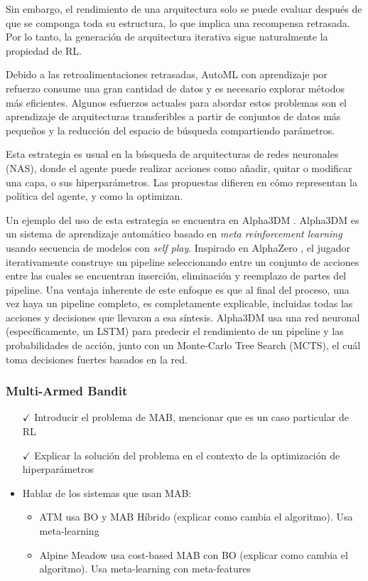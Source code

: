 Sin embargo, el rendimiento de una arquitectura solo se puede evaluar después de que se componga toda su estructura, lo que implica una recompensa retrasada. Por lo tanto, la generación de arquitectura iterativa sigue naturalmente la propiedad de RL. 

Debido a las retroalimentaciones retrasadas, AutoML con aprendizaje por refuerzo consume una gran cantidad de datos y es necesario explorar métodos más eficientes. Algunos esfuerzos actuales para abordar estos problemas son el aprendizaje de arquitecturas transferibles a partir de conjuntos de datos más pequeños y la reducción del espacio de búsqueda compartiendo parámetros.

Esta estrategia es usual en la búsqueda de arquitecturas de redes neuronales (NAS), donde el agente puede realizar acciones como añadir, quitar o modificar una capa, o sus hiperparámetros. Las propuestas difieren en cómo representan la política del agente, y como la optimizan.

Un ejemplo del uso de esta estrategia se encuentra en Alpha3DM \cite{drori2018alphad3m}. Alpha3DM es un sistema de aprendizaje automático basado en \textit{meta reinforcement learning} usando secuencia de modelos con \textit{self play}. Inspirado en AlphaZero \cite{alphazero}, el jugador iterativamente construye un pipeline seleccionando entre un conjunto de acciones entre las cuales se encuentran inserción, eliminación y reemplazo de partes del pipeline. Una ventaja inherente de este enfoque es que al final del proceso, una vez haya un pipeline completo, es completamente explicable, incluidas todas las acciones y decisiones que llevaron a esa síntesis. Alpha3DM usa una red neuronal (específicamente, un LSTM)  para predecir el rendimiento de un pipeline y las probabilidades de acción, junto con un Monte-Carlo Tree Search (MCTS), el cuál toma decisiones fuertes basados en la red.

\subsubsection{Multi-Armed Bandit}


\begin{itemize}
	\item[$\checkmark$] Introducir el problema de MAB, mencionar que es un caso particular de RL
	\item[$\checkmark$] Explicar la solución del problema en el contexto de la optimización de hiperparámetros
	\item Hablar de los sistemas que usan MAB:
	\begin{itemize}
		\item ATM usa BO y MAB Híbrido (explicar como cambia el algoritmo). Usa meta-learning
		\item Alpine Meadow usa cost-based MAB con BO (explicar como cambia el algoritmo). Usa meta-learning con meta-features
	\end{itemize}
\end{itemize}

